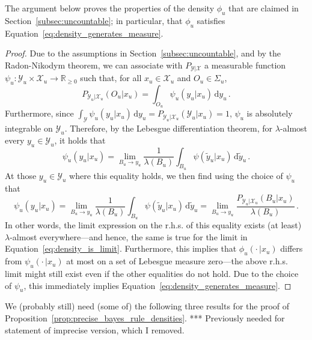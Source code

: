 \documentclass[twoside,11pt]{article}
\newcommand{\reals}{\mathbb{R}}
\newcommand{\realsnonneg}{\reals_{\geq 0}}
\newcommand{\states}{\mathcal{X}}
\newcommand{\observs}{\mathcal{Y}}
\begin{document}
The argument below proves the properties of the density $\phi_u$ that are claimed in Section~\ref{subsec:uncountable}; in particular, that $\phi_u$ satisfies Equation~\eqref{eq:density_generates_measure}.
\begin{proof}
Due to the assumptions in Section~\ref{subsec:uncountable}, and by the Radon-Nikodym theorem, we can associate with $P_{\observs\vert\states}$ a measurable function $\psi_u:\observs_u\times\states_u\to\realsnonneg$ such that, for all $x_u\in\states_u$ and $O_u\in\Sigma_u$,
\begin{equation*}
P_{\observs_u\vert\states_u}(O_u\vert x_u) = \int_{O_u}\psi_u(y_u\vert x_u) \,\mathrm{d}y_u\,.
\end{equation*}
Furthermore, since $\int_{\observs}\psi_u(y_u\vert x_u) \,\mathrm{d}y_u = P_{\observs_u\vert\states_u}(\observs_u\vert x_u)=1$, $\psi_u$ is absolutely integrable on $\observs_u$. Therefore, by the Lebesgue differentiation theorem, for $\lambda$-almost every $y_u\in\observs_u$, it holds that
\begin{equation*}
\psi_u(y_u\vert x_u) = \lim_{B_u\to y_u} \frac{1}{\lambda(B_u)} \int_{B_u} \psi(\tilde{y}_u\vert x_u)\,\mathrm{d}\tilde{y}_u\,.
\end{equation*}
At those $y_u\in\observs_u$ where this equality holds, we then find using the choice of $\psi_u$ that
\begin{equation*}
\psi_u(y_u\vert x_u) = \lim_{B_u\to y_u} \frac{1}{\lambda(B_u)} \int_{B_u} \psi(\tilde{y}_u\vert x_u)\,\mathrm{d}\tilde{y}_u = \lim_{B_u\to y_u} \frac{P_{\observs_u\vert\states_u}(B_u\vert x_u)}{\lambda(B_u)}\,.
\end{equation*}
In other words, the limit expression on the r.h.s. of this equality exists (at least) $\lambda$-almost everywhere---and hence, the same is true for the limit in Equation~\eqref{eq:density_is_limit}. Furthermore, this implies that $\phi_u(\cdot\,\vert x_u)$ differs from $\psi_u(\cdot\,\vert x_u)$ at most on a set of Lebesgue measure zero---the above r.h.s. limit might still exist even if the other equalities do not hold. Due to the choice of $\psi_u$, this immediately implies Equation~\eqref{eq:density_generates_measure}.
\end{proof}


We (probably still) need (some of) the following three results for the proof of Proposition~\ref{prop:precise_bayes_rule_densities}. *** Previously needed for statement of imprecise version, which I removed.
\end{document}
